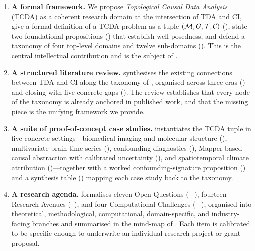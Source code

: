 \begin{enumerate}[label=(\arabic*),leftmargin=2em]
  \item \textbf{A formal framework.} We propose \emph{Topological
        Causal Data Analysis} (TCDA) as a coherent research domain at
        the intersection of TDA and CI, give a formal definition of a
        TCDA problem as a tuple $(\mathcal{M}, G, \mathcal{T}, \mathcal{C})$
        (), state two foundational propositions
        () that
        establish well-posedness, and defend a taxonomy of four
        top-level domains and twelve sub-domains
        (). This is the central intellectual
        contribution and is the subject of .

  \item \textbf{A structured literature review.}
         synthesises the existing connections
        between TDA and CI along the taxonomy of
        , organised across three eras
        () and
        closing with five concrete gaps (). The
        review establishes that every node of the taxonomy is
        already anchored in published work, and that the missing
        piece is the unifying framework we provide.

  \item \textbf{A suite of proof-of-concept case studies.}
         instantiates the TCDA tuple in five
        concrete settings---biomedical imaging and molecular
        structure (), multivariate brain time
        series (), confounding diagnostics
        (), Mapper-based causal abstraction
        with calibrated uncertainty (), and
        spatiotemporal climate attribution
        ()---together with a worked
        confounding-signature proposition
        () and a synthesis table
        () mapping each case study back to the
        taxonomy.

  \item \textbf{A research agenda.}  formalises
        eleven Open Questions (--%
        ), fourteen Research Avenues
        (--), and four
        Computational Challenges (--%
        ), organised into theoretical,
        methodological, computational, domain-specific, and
        industry-facing branches and summarised in the mind-map of
        . Each item is calibrated to be
        specific enough to underwrite an individual research project
        or grant proposal.
\end{enumerate}

